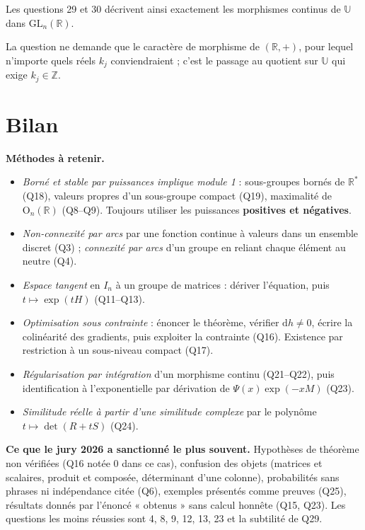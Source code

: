 \documentclass[11pt,a4paper]{article}
\providecommand{\tightlist}{\setlength{\itemsep}{0pt}\setlength{\parskip}{0pt}}
\begin{document}
Les questions 29 et 30 décrivent ainsi exactement les morphismes continus de \(\mathbb U\) dans \({\mathrm{GL}}_n(\mathbb R)\).

\begin{piege}

La question ne demande que le caractère de morphisme de \((\mathbb R,+)\), pour lequel n'importe quels réels \(k_j\) conviendraient ; c'est le passage au quotient sur \(\mathbb U\) qui exige \(k_j\in\mathbb Z\).

\end{piege}

\hypertarget{bilan}{%
\section{Bilan}\label{bilan}}

\textbf{Méthodes à retenir.}

\begin{itemize}
\tightlist
\item
  \emph{Borné et stable par puissances implique module 1} : sous-groupes bornés de \(\mathbb R^*\) (Q18), valeurs propres d'un sous-groupe compact (Q19), maximalité de \({\mathrm{O}}_n(\mathbb R)\) (Q8--Q9). Toujours utiliser les puissances \textbf{positives et négatives}.
\item
  \emph{Non-connexité par arcs} par une fonction continue à valeurs dans un ensemble discret (Q3) ; \emph{connexité par arcs} d'un groupe en reliant chaque élément au neutre (Q4).
\item
  \emph{Espace tangent} en \(I_n\) à un groupe de matrices : dériver l'équation, puis \(t\mapsto\exp(tH)\) (Q11--Q13).
\item
  \emph{Optimisation sous contrainte} : énoncer le théorème, vérifier \(\mathrm dh\ne0\), écrire la colinéarité des gradients, puis exploiter la contrainte (Q16). Existence par restriction à un sous-niveau compact (Q17).
\item
  \emph{Régularisation par intégration} d'un morphisme continu (Q21--Q22), puis identification à l'exponentielle par dérivation de \(\Psi(x)\exp(-xM)\) (Q23).
\item
  \emph{Similitude réelle à partir d'une similitude complexe} par le polynôme \(t\mapsto\det(R+tS)\) (Q24).
\end{itemize}

\textbf{Ce que le jury 2026 a sanctionné le plus souvent.} Hypothèses de théorème non vérifiées (Q16 notée 0 dans ce cas), confusion des objets (matrices et scalaires, produit et composée, déterminant d'une colonne), probabilités sans phrases ni indépendance citée (Q6), exemples présentés comme preuves (Q25), résultats donnés par l'énoncé « obtenus » sans calcul honnête (Q15, Q23). Les questions les moins réussies sont 4, 8, 9, 12, 13, 23 et la subtilité de Q29.
\end{document}
